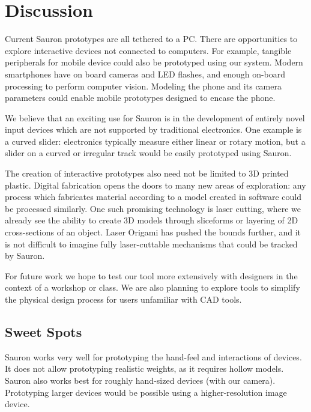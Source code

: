 \section{Discussion}

Current Sauron prototypes are all tethered to a PC. There are opportunities to explore interactive devices not connected to computers. For example, tangible peripherals for mobile device could also be prototyped using our system. Modern smartphones have on board cameras and LED flashes, and enough on-board processing to perform computer vision. Modeling the phone and its camera parameters could enable mobile prototypes designed to encase the phone.

We believe that an exciting use for Sauron is in the development of entirely novel input devices which are not supported by traditional electronics. One example is a curved slider: electronics typically measure either linear or rotary motion, but a slider on a curved or irregular track would be easily prototyped using Sauron.

The creation of interactive prototypes also need not be limited to 3D printed plastic. Digital fabrication opens the doors to many new areas of exploration: any process which fabricates material according to a model created in software could be processed similarly. One such promising technology is laser cutting, where we already see the ability to create 3D models through sliceforms or layering of 2D cross-sections of an object. Laser Origami \cite{mueller-laserorigami} has pushed the bounds further, and it is not difficult to imagine fully laser-cuttable mechanisms that could be tracked by Sauron.

For future work we hope to test our tool more extensively with designers in the context of a workshop or class. We are also planning to explore tools to simplify the physical design process for users unfamiliar with CAD tools. 

    \subsection{Sweet Spots}
    
    Sauron works very well for prototyping the hand-feel and interactions of devices. It does not allow prototyping realistic weights, as it requires hollow models. Sauron also works best for roughly hand-sized devices (with our camera). Prototyping larger devices would be possible using a higher-resolution image device.
    

